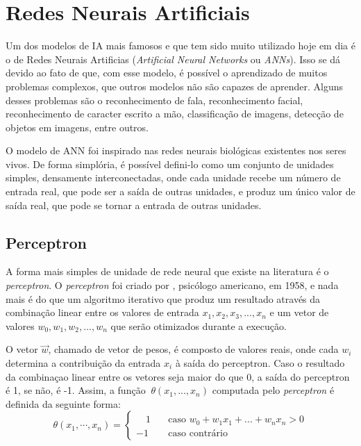

\section{Redes Neurais Artificiais}
Um dos modelos de \ac{IA} mais famosos e que tem sido muito utilizado hoje em dia é o de Redes Neurais Artificias (\textit{Artificial Neural Networks} ou \textit{ANNs}). Isso se dá devido ao fato de que, com esse modelo, é possível o aprendizado de muitos problemas complexos, que outros modelos não são capazes de aprender. Alguns desses problemas são o reconhecimento de fala, reconhecimento facial, reconhecimento de caracter escrito a mão, classificação de imagens, detecção de objetos em imagens, entre outros.

O modelo de \ac{ANN} foi inspirado nas redes neurais biológicas existentes nos seres vivos. De forma simplória, é possível defini-lo como um conjunto de unidades simples, densamente interconectadas, onde cada unidade recebe um número de entrada real, que pode ser a saída de outras unidades, e produz um único valor de saída real, que pode se tornar a entrada de outras unidades.\cite{machine_learning_tom_mitchell, tcc_anomalia_2021}

\subsection{Perceptron}
A forma mais simples de unidade de rede neural que existe na literatura é o \textit{perceptron}. O \textit{perceptron} foi criado por \citeauthor{perceptron_frank_rosenblatt}, psicólogo americano, em 1958, e nada mais é do que um algoritmo iterativo que produz um resultado através da
combinação linear entre os valores de entrada \(x_{1}, x_{2}, x_{3}, ..., x_{n}\) e um vetor de valores
\(w_{0}, w_{1}, w_{2}, ..., w_{n}\) que serão otimizados durante a execução.\cite{perceptron_frank_rosenblatt}\cite{tcc_anomalia_2020}

O vetor \(\overrightarrow{w}\), chamado de vetor de pesos, é composto de valores reais, onde cada \(w_{i}\) determina a contribuição da entrada \(x_{i}\) à saída do perceptron.\cite{machine_learning_tom_mitchell} Caso o resultado da combinaçao linear entre os vetores seja maior do que 0, a saída do perceptron é 1, se não, é -1. Assim, a função \(\ \theta (x_{1}, ..., x_{n})\) computada pelo \textit{perceptron} é definida da seguinte forma:
\begin{equation}
    \theta (x_{1}, \cdots, x_{n}) = 
    \begin{cases}
         \quad1       & \quad \text{caso } w_{0} + w_{1}x_{1} + ... + w_{n}x_{n} > 0\\
        -1  & \quad \text{caso contrário}
    \end{cases}
\label{eq:eq_perceptron_extenso}
\end{equation}

